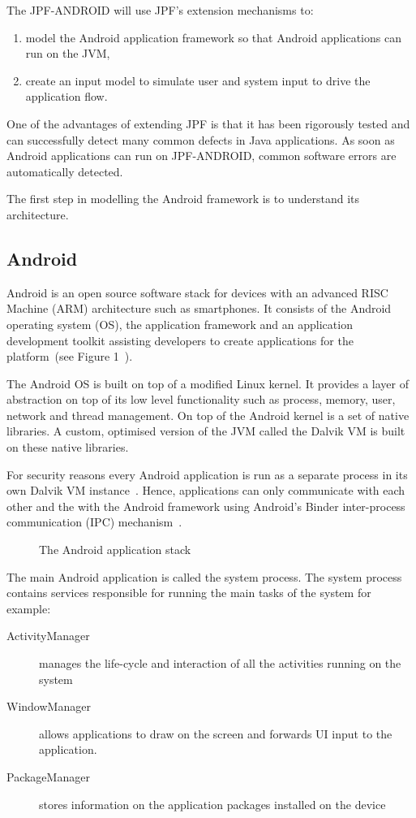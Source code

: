 \documentclass{acm_proc_article-sp}
\begin{document}
The JPF-ANDROID will use JPF's extension mechanisms to:
\begin{enumerate}
\item model the Android application framework so that Android applications can run on the JVM,
\item create an input model to simulate user and system input to drive the application flow.
\end{enumerate}

One of the advantages of extending JPF is that it has been rigorously tested and can successfully detect many common defects in Java applications. As soon as
Android applications can run on JPF-ANDROID, common software errors are automatically detected.

The first step in modelling the Android framework is to understand its architecture.

\subsection{Android}
Android is an open source software stack for devices with an advanced RISC Machine (ARM) architecture  such as smartphones.
It consists of the Android operating system (OS), the application framework and an application development toolkit assisting developers to create
applications for the platform~\cite{AndroidDocs}(see Figure 1~\cite{systemserver}).

The Android OS is built on top of a modified Linux kernel. It provides a layer of abstraction on top of its low level functionality such as process,
memory, user, network and thread management. On top of the Android kernel is a set of native libraries. A custom, optimised
version of the JVM called the Dalvik VM is built on these native libraries.

For security reasons every Android application is run as a separate process in its own Dalvik VM instance~\cite{AndroidSecurity}. Hence, applications can only
communicate with each other and the with the Android framework using Android's Binder inter-process communication (IPC)
mechanism~\cite{Binder}. 

\begin{figure}
\centering
{}
\caption{The Android application stack}
\end{figure}

The main Android application is called the system process. The system process contains services responsible for running the main tasks of the system for example:
\begin{description}
 \item [ActivityManager] manages the life-cycle and interaction of all the activities running on the system
 \item [WindowManager] allows applications to draw on the screen and forwards UI input to the application.
 \item [PackageManager] stores information on the application packages installed on the device
\end{description}
\end{document}
